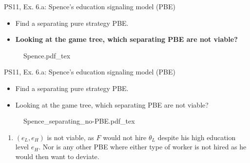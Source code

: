 \begin{frame}{PS11, Ex. 6.a: Spence’s education signaling model (PBE)}
    \begin{multicols}{2}
      \begin{itemize}
        \item[(a)] Find a separating pure strategy PBE.
        \item[Step 1:] \textbf{Looking at the game tree, which separating PBE are not viable?}
      \end{itemize}\vspace{-6pt}
      \vfill\null\columnbreak
      \begin{figure}[!h]
        \center
        \def\svgwidth{1.1\columnwidth}
        {Spence.pdf_tex}
      \end{figure}\vspace{-4pt}
      \vfill\null
    \end{multicols}
\end{frame}
\begin{frame}{PS11, Ex. 6.a: Spence’s education signaling model (PBE)}
    \begin{multicols}{2}
      \begin{itemize}
        \item[(a)] Find a separating pure strategy PBE.
        \item[Step 1:] Looking at the game tree, which separating PBE are not viable?
      \end{itemize}\vspace{-6pt}
      \vfill\null\columnbreak
      \begin{figure}[!h]
        \center{}
        {Spence_separating_no-PBE.pdf_tex}
      \end{figure}\vspace{-6pt}
      \begin{enumerate}
        \item $(e_L,e_H)$ is not viable, as $F$ would not hire $\theta_L$ despite his high education level $e_H$. Nor is any other PBE where either type of worker is not hired as he would then want to deviate.
      \end{enumerate}
      \vfill\null
    \end{multicols}
\end{frame}

